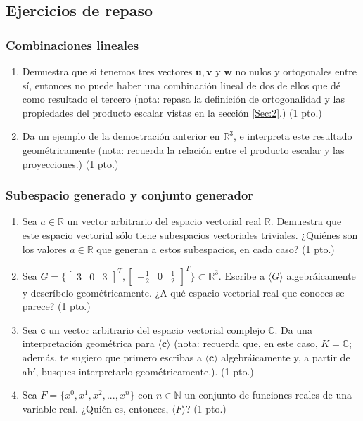 \documentclass[12pt]{article}
\begin{document}
\subsection{Ejercicios de repaso}

\subsubsection{Combinaciones lineales}

\begin{enumerate}
    \item Demuestra que si tenemos tres vectores $\mathbf{u}, \mathbf{v}$ y $\mathbf{w}$ no nulos y ortogonales entre sí, entonces no puede haber una combinación lineal de dos de ellos que dé como resultado el tercero (nota: repasa la definición de ortogonalidad y las propiedades del producto escalar vistas en la sección \ref{Sec:2}.) (1 pto.)
    \item Da un ejemplo de la demostración anterior en $\mathbb{R}^3$, e interpreta este resultado geométricamente (nota: recuerda la relación entre el producto escalar y las proyecciones.) (1 pto.)
\end{enumerate}

\subsubsection{Subespacio generado y conjunto generador}

\begin{enumerate}
    \item Sea $a\in\mathbb{R}$ un vector arbitrario del espacio vectorial real $\mathbb{R}$. Demuestra que este espacio vectorial sólo tiene subespacios vectoriales triviales. ¿Quiénes son los valores $a\in\mathbb{R}$ que generan a estos subespacios, en cada caso? (1 pto.)
    \item Sea $G=\{\begin{bmatrix} 3 & 0 & 3 \end{bmatrix}^T, \begin{bmatrix} -\frac{1}{2} & 0 & \frac{1}{2} \end{bmatrix}^T\}\subset\mathbb{R}^3.$ Escribe a $\langle G \rangle$ algebráicamente y descríbelo geométricamente. ¿A qué espacio vectorial real que conoces se parece? (1 pto.)
    \item Sea $\mathbf{c}$ un vector arbitrario del espacio vectorial complejo $\mathbb{C}$. Da una interpretación geométrica para $\langle \mathbf{c} \rangle$ (nota: recuerda que, en este caso, $K=\mathbb{C}$; además, te sugiero que primero escribas a $\langle \mathbf{c}\rangle$ algebráicamente y, a partir de ahí, busques interpretarlo geométricamente.). (1 pto.)
    \item Sea $F=\{x^0,x^1,x^2,...,x^n\}$ con $n\in\mathbb{N}$ un conjunto de funciones reales de una variable real. ¿Quién es, entonces, $\langle F \rangle$? (1 pto.)
\end{enumerate}
\end{document}
